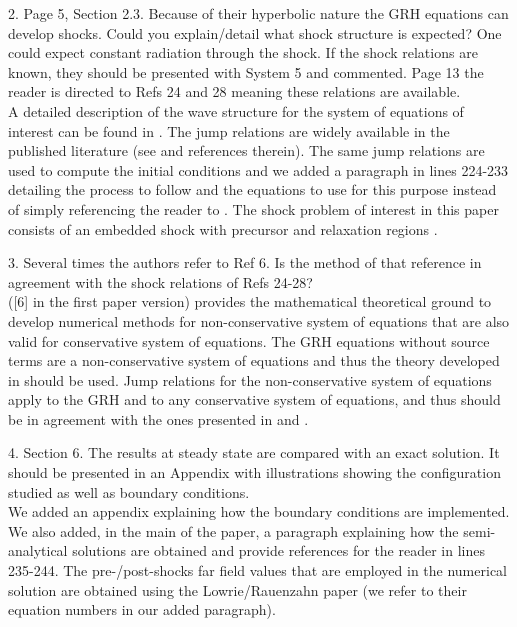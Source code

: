 \documentclass{article}
\begin{document}
{\color{blue}
2. Page 5, Section 2.3. Because of their hyperbolic nature the GRH equations can develop shocks.
Could you explain/detail what shock structure is expected? One could expect constant radiation through the shock.
If the shock relations are known, they should be presented with System 5 and commented. Page 13 the reader is directed to Refs 24 and 28 meaning these relations are available.\\}
A detailed description of the wave structure for the system of equations of interest can be found in \cite{Balsara}. The jump relations are widely available in the published literature (see \cite{LowrieEdwards, LowrieMorelHittinger} and references therein). The same jump relations are used to compute the initial conditions and we added a paragraph in lines 224-233 detailing the process to follow and the equations to use for this purpose instead of simply referencing the reader to \cite{LowrieEdwards}. The shock problem of interest in this paper consists of an embedded shock with precursor and relaxation regions \cite{LowrieEdwards}.
\bigskip

{\color{blue}
3. Several times the authors refer to Ref 6. Is the method of that reference in agreement with the shock relations of Refs 24-28?
\\}
\cite{dlm} ([6] in the first paper version) provides the mathematical theoretical ground to develop numerical methods for non-conservative system of equations that are also valid for conservative system of equations. The GRH equations without source terms are a non-conservative system of equations and thus the theory developed in \cite{dlm} should be used. Jump relations for the non-conservative system of equations apply to the GRH and to any conservative system of equations, and thus should be in agreement with the ones presented in \cite{LowrieEdwards} and \cite{Toro}.
\bigskip

{\color{blue}
4. Section 6. The results at steady state are compared with an exact solution. It should be presented in an Appendix with illustrations showing the configuration studied as well as boundary conditions. \\}
We added an appendix explaining how the boundary conditions are implemented. We also added, in the main of the paper, a paragraph explaining how the semi-analytical solutions are obtained and provide references for the reader in lines 235-244. The pre-/post-shocks far field values that are employed in the numerical solution are obtained using the Lowrie/Rauenzahn paper \cite{LowrieRauenzahn} (we refer to their equation numbers in our added paragraph).
\end{document}
